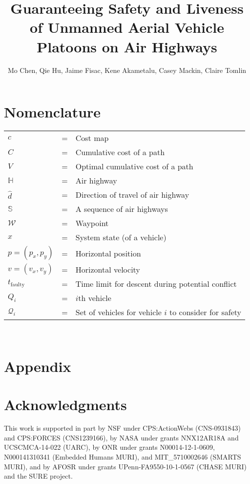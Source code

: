 \documentclass[submit]{aiaa-pretty}
\author{Mo Chen, Qie Hu, Jaime Fisac, Kene Akametalu, Casey Mackin, Claire Tomlin}
\title{Guaranteeing Safety and Liveness of Unmanned Aerial Vehicle Platoons on Air Highways}
\newcommand{\pos}{p} %
\newcommand{\vel}{v} %
\newcommand{\hw}{\mathbb{H}} %
\newcommand{\hws}{\mathbb{S}} %
\newcommand{\hwd}{\hat{d}}
\newcommand{\wpt}{\mathcal{W}}
\newcommand{\cmap}{c}
\newcommand{\ccost}{C}
\newcommand{\ocost}{V}
\newcommand{\td}{t_\text{faulty}} %
\newcommand{\veh}[1]{Q_{#1}}
\newcommand{\vehSCS}[1]{\mathcal{Q}_{#1}} %
\begin{document}
\maketitle

\section*{Nomenclature}
\noindent\begin{tabular}{@{}lcl@{}}
$\cmap$ &=& Cost map \\
$\ccost$ &=& Cumulative cost of a path \\
$\ocost$ &=& Optimal cumulative cost of a path \\
$\hw$ &=& Air highway \\
$\hwd$ &=& Direction of travel of air highway \\
$\hws$ &=& A sequence of air highways \\
$\wpt$ &=& Waypoint \\
$x$ &=& System state (of a vehicle) \\
$\pos=(\pos_x, \pos_y)$ &=& Horizontal position \\
$\vel=(\vel_x, \vel_y)$ &=& Horizontal velocity \\
$\td$ &=& Time limit for descent during potential conflict \\
$\veh{i}$ &=& $i$th vehicle \\
$\vehSCS{i}$ &=& Set of vehicles for vehicle $i$ to consider for safety 
\end{tabular} \\















\section*{Appendix}

\section*{Acknowledgments}
This work is supported in part by NSF under CPS:ActionWebs (CNS-0931843) and CPS:FORCES (CNS1239166), by NASA under grants NNX12AR18A and UCSCMCA-14-022 (UARC), by ONR under grants N00014-12-1-0609, N000141310341 (Embedded Humans MURI), and MIT\_5710002646 (SMARTS MURI), and by AFOSR under grants UPenn-FA9550-10-1-0567 (CHASE MURI) and the SURE project.



\end{document}
